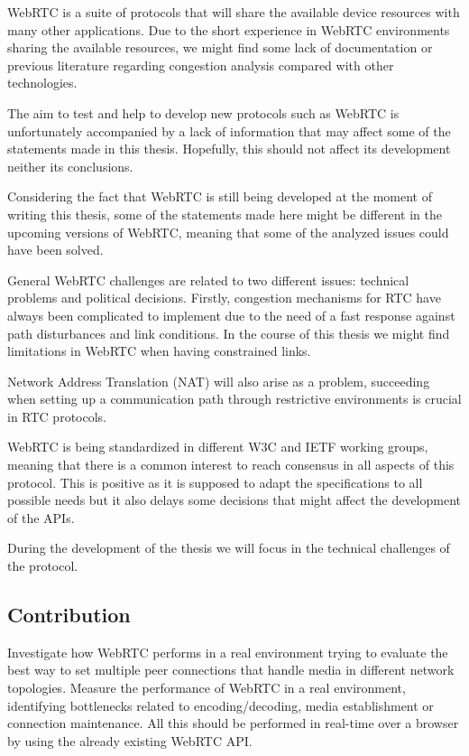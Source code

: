 WebRTC is a suite of protocols that will share the available device resources with many other applications. Due to the short experience in WebRTC environments sharing the available resources, we might find some lack of documentation or previous literature regarding congestion analysis compared with other technologies. 

The aim to test and help to develop new protocols such as WebRTC is unfortunately accompanied by a lack of information that may affect some of the statements made in this thesis. Hopefully, this should not affect its development neither its conclusions.

Considering the fact that WebRTC is still being developed at the moment of writing this thesis, some of the statements made here might be different in the upcoming versions of WebRTC, meaning that some of the analyzed issues could have been solved.

General WebRTC challenges are related to two different issues: technical problems and political decisions. Firstly, congestion mechanisms for RTC have always been  complicated to implement due to the need of a fast response against path disturbances and link conditions. In the course of this thesis we might find limitations in WebRTC when having constrained links.

Network Address Translation (NAT)  will also arise as a problem, succeeding when setting up a communication path through restrictive environments is crucial in RTC protocols.

WebRTC is being standardized in different W3C and IETF working groups, meaning that there is a common interest to reach consensus in all aspects of this protocol. This is positive as it is supposed to adapt the specifications to all possible needs but it also delays some decisions that might affect the development of the APIs.

During the development of the thesis we will focus in the technical challenges of the protocol.

\subsection{Contribution}

Investigate how WebRTC performs in a real environment trying to evaluate the best way to set multiple peer connections that handle media in different network topologies. Measure the performance of WebRTC in a real environment, identifying bottlenecks related to encoding/decoding, media establishment or connection maintenance. All this should be performed in real-time over a browser by using the already existing WebRTC API.

